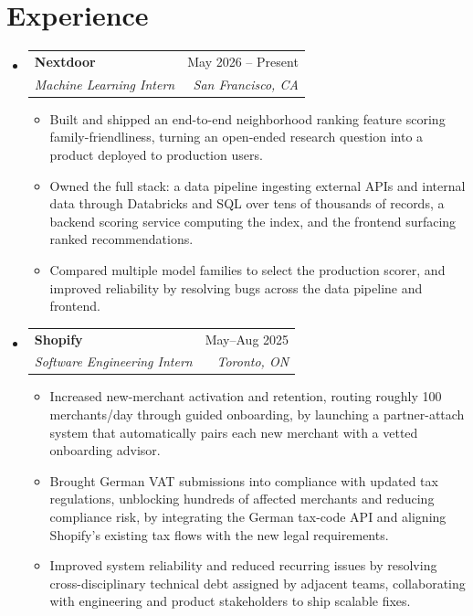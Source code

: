 \documentclass[letterpaper,11pt]{article}
\makeatletter
\newcommand{\resumeItem}[1]{
  \item\small{
    {#1 \vspace{-3pt}}
  }
}
\newcommand{\resumeSubheading}[4]{
  \vspace{-2pt}\item
    \begin{tabular*}{0.97\textwidth}[t]{l@{\extracolsep{\fill}}r}
      \textbf{#1} & #2 \\
      \textit{\small#3} & \textit{\small #4} \\
    \end{tabular*}\vspace{-5pt}
}
\newcommand{\resumeSubHeadingListStart}{\begin{itemize}[leftmargin=0.15in, label={}]}
\newcommand{\resumeSubHeadingListEnd}{\end{itemize}}
\newcommand{\resumeItemListStart}{\begin{itemize}}
\newcommand{\resumeItemListEnd}{\end{itemize}\vspace{-7pt}}
\makeatother
\begin{document}
\section{Experience}
  \resumeSubHeadingListStart
    \resumeSubheading
      {Nextdoor}{May 2026 -- Present}
      {Machine Learning Intern}{San Francisco, CA}
      \resumeItemListStart
        \resumeItem{Built and shipped an end-to-end neighborhood ranking feature scoring family-friendliness, turning an open-ended research question into a product deployed to production users.}
        \resumeItem{Owned the full stack: a data pipeline ingesting external APIs and internal data through Databricks and SQL over tens of thousands of records, a backend scoring service computing the index, and the frontend surfacing ranked recommendations.}
        \resumeItem{Compared multiple model families to select the production scorer, and improved reliability by resolving bugs across the data pipeline and frontend.}
      \resumeItemListEnd
    \resumeSubheading
      {Shopify}{May--Aug 2025}
      {Software Engineering Intern}{Toronto, ON}
      \resumeItemListStart
        \resumeItem{Increased new-merchant activation and retention, routing roughly 100 merchants/day through guided onboarding, by launching a partner-attach system that automatically pairs each new merchant with a vetted onboarding advisor.}
        \resumeItem{Brought German VAT submissions into compliance with updated tax regulations, unblocking hundreds of affected merchants and reducing compliance risk, by integrating the German tax-code API and aligning Shopify's existing tax flows with the new legal requirements.}
        \resumeItem{Improved system reliability and reduced recurring issues by resolving cross-disciplinary technical debt assigned by adjacent teams, collaborating with engineering and product stakeholders to ship scalable fixes.}
      \resumeItemListEnd
  \resumeSubHeadingListEnd
\end{document}

